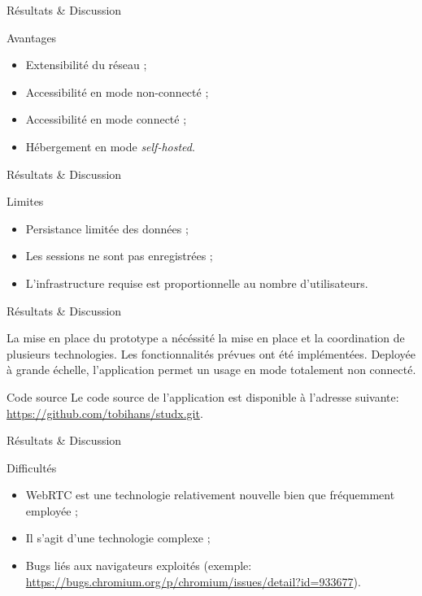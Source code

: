 \documentclass{beamer}
\begin{document}
\begin{frame}{Résultats \& Discussion}
  \begin{block}{Avantages}
    \begin{itemize}
      \item Extensibilité du réseau ;
      \item Accessibilité en mode non-connecté ;
      \item Accessibilité en mode connecté ;
      \item Hébergement en mode \textit{self-hosted}.
    \end{itemize}
  \end{block}
\end{frame}

\begin{frame}{Résultats \& Discussion}
  \begin{block}{Limites}
    \begin{itemize}
      \item Persistance limitée des données ;
      \item Les sessions ne sont pas enregistrées ;
      \item L'infrastructure requise est proportionnelle au nombre d'utilisateurs.
    \end{itemize}
  \end{block}
\end{frame}

\begin{frame}{Résultats \& Discussion}
  \begin{block}{}
    La mise en place du prototype a nécéssité la mise en place et la coordination de plusieurs technologies.
    Les fonctionnalités prévues ont été implémentées. Deployée à grande échelle, l'application permet un usage en mode totalement non connecté.
  \end{block}

  \begin{block}{Code source}    
    Le code source de l'application est disponible à l'adresse suivante:
    \url{https://github.com/tobihans/studx.git}.
  \end{block}
\end{frame}

\begin{frame}{Résultats \& Discussion}
  \begin{block}{Difficultés}
    \begin{itemize}
      \item WebRTC est une technologie relativement nouvelle bien que fréquemment employée ;
      \item Il s'agit d'une technologie complexe ;
      \item Bugs liés aux navigateurs exploités (exemple: \url{https://bugs.chromium.org/p/chromium/issues/detail?id=933677}).
    \end{itemize}
  \end{block}
\end{frame}
\end{document}
